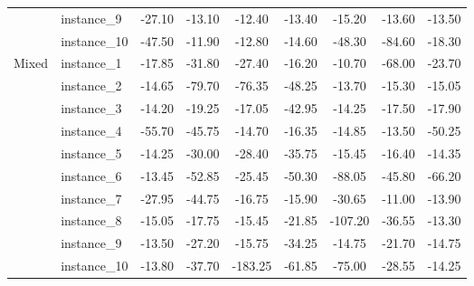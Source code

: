 \documentclass[sigconf]{acmart}
\begin{document}
\begin{table}[htbp]
\begin{tabular}{llccccccc}
 & instance\_9 & -27.10 & -13.10 & -12.40 & -13.40 & -15.20 & -13.60 & -13.50 \\
 & instance\_10 & -47.50 & -11.90 & -12.80 & -14.60 & -48.30 & -84.60 & -18.30 \\
\midrule
Mixed & instance\_1 & -17.85 & -31.80 & -27.40 & -16.20 & -10.70 & -68.00 & -23.70 \\
 & instance\_2 & -14.65 & -79.70 & -76.35 & -48.25 & -13.70 & -15.30 & -15.05 \\
 & instance\_3 & -14.20 & -19.25 & -17.05 & -42.95 & -14.25 & -17.50 & -17.90 \\
 & instance\_4 & -55.70 & -45.75 & -14.70 & -16.35 & -14.85 & -13.50 & -50.25 \\
 & instance\_5 & -14.25 & -30.00 & -28.40 & -35.75 & -15.45 & -16.40 & -14.35 \\
 & instance\_6 & -13.45 & -52.85 & -25.45 & -50.30 & -88.05 & -45.80 & -66.20 \\
 & instance\_7 & -27.95 & -44.75 & -16.75 & -15.90 & -30.65 & -11.00 & -13.90 \\
 & instance\_8 & -15.05 & -17.75 & -15.45 & -21.85 & -107.20 & -36.55 & -13.30 \\
 & instance\_9 & -13.50 & -27.20 & -15.75 & -34.25 & -14.75 & -21.70 & -14.75 \\
 & instance\_10 & -13.80 & -37.70 & -183.25 & -61.85 & -75.00 & -28.55 & -14.25 \\
\bottomrule
\end{tabular}
\end{table}
\end{document}
